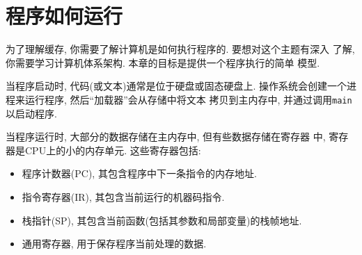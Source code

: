 \documentclass[12pt]{book}
\begin{document}
{\section{程序如何运行}

为了理解缓存, 你需要了解计算机是如何执行程序的. 要想对这个主题有深入
了解, 你需要学习计算机体系架构. 本章的目标是提供一个程序执行的简单
模型.

当程序启动时, 代码(或文本)通常是位于硬盘或固态硬盘上. 
操作系统会创建一个进程来运行程序, 然后``加载器''会从存储中将文本
拷贝到主内存中, 并通过调用{\tt main}以启动程序.

当程序运行时, 大部分的数据存储在主内存中, 但有些数据存储在寄存器
中, 寄存器是CPU上的小的内存单元. 这些寄存器包括:

\begin{itemize}

\item 程序计数器(PC), 其包含程序中下一条指令的内存地址.

\item 指令寄存器(IR), 其包含当前运行的机器码指令.

\item 栈指针(SP), 其包含当前函数(包括其参数和局部变量)的栈帧地址.

\item 通用寄存器, 用于保存程序当前处理的数据. 


\end{itemize}}
\end{document}
